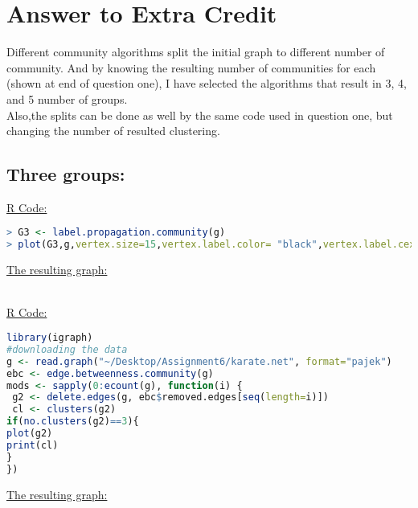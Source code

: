 \documentclass[letterpaper,11pt]{article}
\begin{document}
\section*{Answer to Extra Credit}
Different community algorithms split the initial graph to different number of community. And by knowing the resulting number of communities for each (shown at end of question one), I have selected the algorithms that result in 3, 4, and 5 number of groups.
\\
Also,the splits can be done as well by the same code used in question one, but changing the number of resulted clustering.\\

\subsection*{Three groups:}
\uline{R Code:}\\
\begin{lstlisting}[language=R,frame=single]
> G3 <- label.propagation.community(g)
> plot(G3,g,vertex.size=15,vertex.label.color= "black",vertex.label.cex=0.45,layout=layout.fruchterman.reingold)
\end{lstlisting}

\uline{The resulting graph:}\\
\\
\noindent
\begin{minipage}{\linewidth}
\label{visina8}
\end{minipage}

\uline{R Code:}\\
\begin{lstlisting}[language=R,frame=single]
library(igraph)
#downloading the data
g <- read.graph("~/Desktop/Assignment6/karate.net", format="pajek")
ebc <- edge.betweenness.community(g)
mods <- sapply(0:ecount(g), function(i) {
 g2 <- delete.edges(g, ebc$removed.edges[seq(length=i)])
 cl <- clusters(g2)
if(no.clusters(g2)==3){
plot(g2)
print(cl)
}
})
\end{lstlisting}
\uline{The resulting graph:}\\
\noindent
\begin{minipage}{\linewidth}
\label{visina8}
\end{minipage}
\\
\newpage
\end{document}
